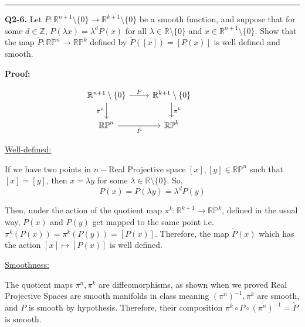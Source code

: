 \documentclass{article}
\newcommand{\R}{\mathbb{R}}
\begin{document}
\vskip 0.5cm
\hrule 
\vskip 0.5cm

\textbf{Q2-6.} Let $P : \R^{n+1} \setminus \{0\} \rightarrow \R^{k+1} \setminus \{0\}$ be a smooth function, and suppose that for some $d \in \mathbb{Z}$, $P(\lambda x) = \lambda^d P(x)$ for all $\lambda \in \R \setminus \{0\}$ and $x \in \R^{n + 1} \setminus \{0\}$. Show that the map $\tilde{P} : \mathbb{RP}^n \rightarrow \mathbb{RP}^{k}$ defined by $\tilde{P}([x]) = [P(x)]$ is well defined and smooth.

\vskip 0.5cm
\textbf{Proof:}



\[\begin{tikzcd}
	{\mathbb{R}^{n+1} \setminus \{0\}} & {\mathbb{R}^{k+1} \setminus \{0\}} \\
	{\mathbb{RP}^{n}} & {\mathbb{RP}^{k}} & {}
	\arrow["{\pi^n}"', from=1-1, to=2-1]
	\arrow["P", from=1-1, to=1-2]
	\arrow["{\tilde{P}}"', from=2-1, to=2-2]
	\arrow["{\pi^k}", from=1-2, to=2-2]
\end{tikzcd}\]

\vskip 0.25cm
\underline{Well-defined:} 

\vskip 0.25cm
If we have two points in $n-$Real Projective space $[x], [y] \in \mathbb{RP}^{n}$ such that $[x] = [y]$, then $x = \lambda y$ for some $\lambda \in \R \setminus \{0\}$. So, 
\[ P(x) = P(\lambda y) = \lambda^d P(y) \]

\vskip 0.25cm
Then, under the action of the quotient map $\pi^{k} : \mathbb{R}^{k+1} \rightarrow \mathbb{RP}^k$, defined in the usual way, $P(x)$ and $P(y)$ get mapped to the same point i.e. $\pi^k(P(x)) = \pi^k(P(y)) = [P(x)]$. Therefore, the map $\tilde{P}(x)$ which has the action $[x] \mapsto [P(x)]$ is well defined.

\vskip 0.5cm
\underline{Smoothness:}

\vskip 0.25cm
The quotient maps $\pi^n, \pi^k$ are diffeomorphisms, as shown when we proved Real Projective Spaces are smooth manifolds in class meaning $\left( \pi^n \right)^{-1}, \pi^k$ are smooth, and $P$ is smooth by hypothesis. Therefore, their composition $\pi^k \circ P \circ \left( \pi^n \right)^{-1} = \tilde{P}$ is smooth.
\end{document}
